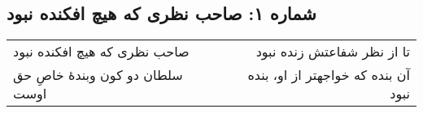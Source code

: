 \begin{center}
\section*{شماره ۱: صاحب نظری که هیچ افکنده نبود}
\label{sec:001}
\begin{longtable}{l p{0.5cm} r}
صاحب نظری که هیچ افکنده نبود
&&
تا از نظر شفاعتش زنده نبود
\\
سلطان دو کون وبندهٔ خاصِ حق اوست
&&
آن بنده که خواجهتر از او، بنده نبود
\\
\end{longtable}
\end{center}
